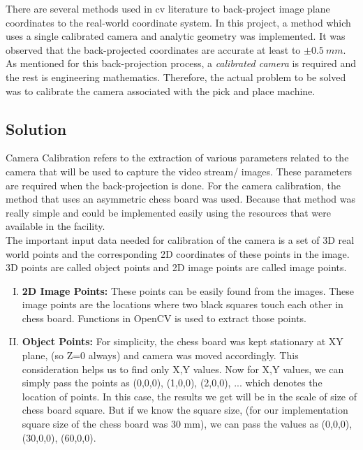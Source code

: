 \documentclass[a4paper,12pt]{report}%
\begin{document}
There are several methods used in \ac{cv}  literature to back-project image plane coordinates to the real-world coordinate system. In this project, a method which uses a single calibrated camera and analytic geometry was implemented. It was observed that the back-projected coordinates are accurate at least to $\pm 0.5 ~mm$. As mentioned for this back-projection process, a \textit{calibrated camera} is required and the rest is engineering mathematics. Therefore, the actual problem to be solved was to calibrate the camera associated with the pick and place machine.



\subsection{Solution}
Camera Calibration refers to the extraction of various parameters related to the camera that will be used to capture the video stream/ images. These parameters are required when the back-projection is done. For the camera calibration, the method that uses an asymmetric chess board was used\cite{cam_calib:_nodate}. Because that method was really simple and could be implemented easily using the resources that were available in the facility.\\


The important input data needed for calibration of the camera is a set of 3D real world points and the corresponding 2D coordinates of these points in the image. 3D points are called object points and 2D image points are called image points.

\begin{enumerate}[I.]
	\item \textbf{2D Image Points:} These points can be easily found from the images. These image points are the locations where two black squares touch each other in chess board. Functions in OpenCV is used to extract those points\cite{cam_calib:_nodate}.
	
	\item \textbf{Object Points:}  For simplicity, the chess board was kept stationary at XY plane, (so Z=0 always) and camera was moved accordingly. This consideration helps us to find only X,Y values. Now for X,Y values, we can simply pass the points as (0,0,0), (1,0,0), (2,0,0), ... which denotes the location of points. In this case, the results we get will be in the scale of size of chess board square\cite{cam_calib:_nodate}. But if we know the square size, (for our implementation square size of the chess board was 30 mm), we can pass the values as (0,0,0), (30,0,0), (60,0,0).
\end{enumerate}
\end{document}
